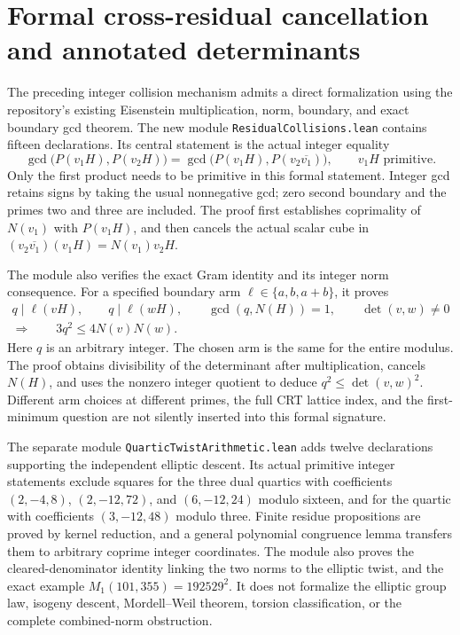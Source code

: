 \section{Formal cross-residual cancellation and annotated determinants}
\label{sec:formal-residual-collisions}

The preceding integer collision mechanism admits a direct formalization
using the repository's existing Eisenstein multiplication, norm, boundary,
and exact boundary gcd theorem.  The new module
\texttt{ResidualCollisions.lean} contains fifteen declarations.  Its central
statement is the actual integer equality
\[
 \gcd\bigl(P(v_1H),P(v_2H)\bigr)
 =\gcd\bigl(P(v_1H),P(v_2\overline{v_1})\bigr),
 \qquad v_1H\text{ primitive}.
\]
Only the first product needs to be primitive in this formal statement.
Integer gcd retains signs by taking the usual nonnegative gcd; zero second
boundary and the primes two and three are included.  The proof first
establishes coprimality of $N(v_1)$ with $P(v_1H)$, and then cancels the
actual scalar cube in
$(v_2\overline{v_1})(v_1H)=N(v_1)v_2H$.

The module also verifies the exact Gram identity and its integer norm
consequence.  For a specified boundary arm $\ell\in\{a,b,a+b\}$, it proves
\[
 \begin{gathered}
  q\mid\ell(vH),\qquad q\mid\ell(wH),\qquad
  \gcd(q,N(H))=1,\qquad \det(v,w)\ne0
  \\
  \Longrightarrow\qquad 3q^2\le4N(v)N(w).
 \end{gathered}
\]
Here $q$ is an arbitrary integer.  The chosen arm is the same for the entire
modulus.  The proof obtains divisibility of the determinant after
multiplication, cancels $N(H)$, and uses the nonzero integer quotient to
deduce $q^2\le\det(v,w)^2$.  Different arm choices at different primes,
the full CRT lattice index, and the first-minimum question are not silently
inserted into this formal signature.

The separate module \texttt{QuarticTwistArithmetic.lean} adds twelve
declarations supporting the independent elliptic descent.  Its actual
primitive integer statements exclude squares for the three dual quartics
with coefficients $(2,-4,8)$, $(2,-12,72)$, and $(6,-12,24)$ modulo sixteen,
and for the quartic with coefficients $(3,-12,48)$ modulo three.
Finite residue propositions are proved by kernel reduction, and a general
polynomial congruence lemma transfers them to arbitrary coprime integer
coordinates.  The module also proves the cleared-denominator identity
linking the two norms to the elliptic twist, and the exact example
$M_1(101,355)=192529^2$.  It does not formalize the elliptic group law,
isogeny descent, Mordell--Weil theorem, torsion classification, or the
complete combined-norm obstruction.

